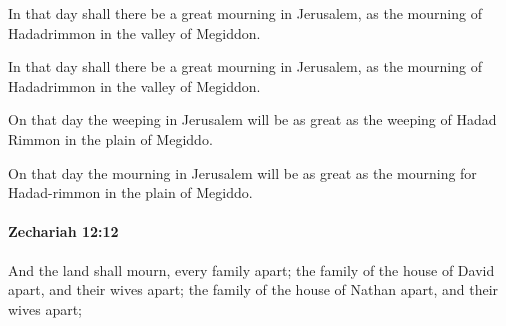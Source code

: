 			In that day shall there be a great mourning in Jerusalem, as the mourning of Hadadrimmon in the valley of Megiddon.

			\begin{versebox}
					\item[BHS] 
					\item[LXX] 
					\item[ASV] In that day shall there be a great mourning in Jerusalem, as the mourning of Hadadrimmon in the valley of Megiddon.
					\item[NIV] On that day the weeping in Jerusalem will be as great as the weeping of Hadad Rimmon in the plain of Megiddo.
					\item[NRSV] On that day the mourning in Jerusalem will be as great as the mourning for Hadad-rimmon in the plain of Megiddo.
			\end{versebox}

		\paragraph{Zechariah 12:12} %
			\label{ZECHARIAH-12-12}

			And the land shall mourn, every family apart; the family of the house of David apart, and their wives apart; the family of the house of Nathan apart, and their wives apart;

